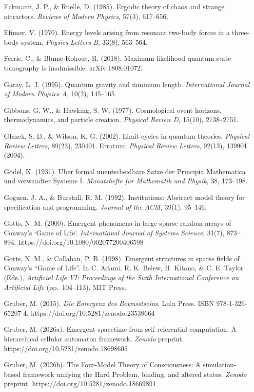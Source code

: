 \documentclass[
]{article}
\begin{document}
Eckmann, J. P., \& Ruelle, D. (1985). Ergodic theory of chaos and
strange attractors. \emph{Reviews of Modern Physics}, 57(3), 617--656.

Efimov, V. (1970). Energy levels arising from resonant two-body forces
in a three-body system. \emph{Physics Letters B}, 33(8), 563--564.

Ferrie, C., \& Blume-Kohout, R. (2018). Maximum likelihood quantum state
tomography is inadmissible. arXiv:1808.01072.

Garay, L. J. (1995). Quantum gravity and minimum length.
\emph{International Journal of Modern Physics A}, 10(2), 145--165.

Gibbons, G. W., \& Hawking, S. W. (1977). Cosmological event horizons,
thermodynamics, and particle creation. \emph{Physical Review D}, 15(10),
2738--2751.

Głazek, S. D., \& Wilson, K. G. (2002). Limit cycles in quantum
theories. \emph{Physical Review Letters}, 89(23), 230401. Erratum:
\emph{Physical Review Letters}, 92(13), 139901 (2004).

Gödel, K. (1931). Uber formal unentscheidbare Satze der Principia
Mathematica und verwandter Systeme I. \emph{Monatshefte fur Mathematik
und Physik}, 38, 173--198.

Goguen, J. A., \& Burstall, R. M. (1992). Institutions: Abstract model
theory for specification and programming. \emph{Journal of the ACM},
39(1), 95--146.

Gotts, N. M. (2000). Emergent phenomena in large sparse random arrays of
Conway's `Game of Life'. \emph{International Journal of Systems
Science}, 31(7), 873--894. https://doi.org/10.1080/002077200406598

Gotts, N. M., \& Callahan, P. B. (1998). Emergent structures in sparse
fields of Conway's ``Game of Life''. In C. Adami, R. K. Belew, H.
Kitano, \& C. E. Taylor (Eds.), \emph{Artificial Life VI: Proceedings of
the Sixth International Conference on Artificial Life} (pp.~104--113).
MIT Press.

Gruber, M. (2015). \emph{Die Emergenz des Bewusstseins}. Lulu Press.
ISBN 978-1-326-65207-4. https://doi.org/10.5281/zenodo.23538664

Gruber, M. (2026a). Emergent spacetime from self-referential
computation: A hierarchical cellular automaton framework. \emph{Zenodo}
preprint. https://doi.org/10.5281/zenodo.18698605

Gruber, M. (2026b). The Four-Model Theory of Consciousness: A
simulation-based framework unifying the Hard Problem, binding, and
altered states. \emph{Zenodo} preprint.
https://doi.org/10.5281/zenodo.18669891
\end{document}
